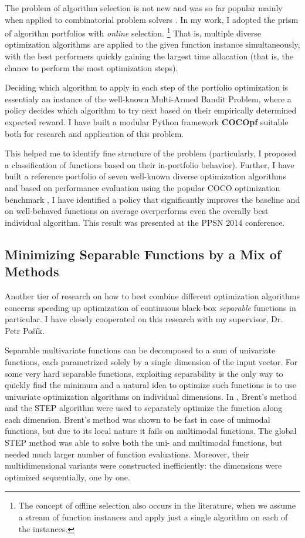 The problem of algorithm selection is not new \citep{Rice}
and was so far popular mainly when applied to
combinatorial problem solvers \citep{combpfsurvey}.
In my work, I adopted the prism of algorithm portfolios \citep{algportfolios}
with \textit{online} selection.%
\footnote{The concept of offline selection also occurs in the literature,
	when we assume a stream of function instances and apply just a single
	algorithm on each of the instances.}
That is, multiple diverse optimization algorithms are applied
to the given function instance simultaneously, with the best
performers quickly gaining the largest time allocation (that is,
the chance to perform the most optimization steps).

Deciding which algorithm to apply in each step of the portfolio
optimization is essentialy an instance of the well-known Multi-Armed
Bandit Problem, where a policy decides which algorithm to try next
based on their empirically determined expected reward.
I have built a modular Python framework \textbf{COCOpf} \citep{COCOpf}
suitable both for research and application of this problem.

This helped me to identify fine structure of the problem
(particularly, I proposed a classification of functions based on
their in-portfolio behavior).
Further, I have built a reference portfolio of seven well-known
diverse optimization algorithms and based on performance evaluation
using the popular COCO optimization benchmark \citep{COCO1}, I have
identified a policy that significantly improves the baseline and
on well-behaved functions on average overperforms even the overally
best individual algorithm. This result was presented at the
PPSN 2014 conference. \citep{optpf}

\subsection{Minimizing Separable Functions by a Mix of Methods}

Another tier of research on how to best combine different optimization
algorithms concerns speeding up optimization of continuous black-box
\textit{separable} functions in particular.  I have closely cooperated
on this research with my supervisor, Dr. Petr Pošík.

Separable multivariate functions can be decomposed to a sum of univariate
functions, each parametrized solely by a single dimension of the input
vector.
For some very hard separable functions, exploiting separability
is the only way to quickly find the minimum and a natural idea to optimize
such functions is to use univariate optimization algorithms on individual
dimensions.
In \citep{PosikGECCO2009LineSearch}, Brent's method \citep{Brent1973} and the STEP algorithm \citep{STEP} were used to separately optimize the function along each dimension.
Brent's method was shown to be fast in case of unimodal functions, but due to its local nature it fails on multimodal functions.
The global STEP method was able to solve both the uni- and multimodal functions, but needed much larger number of function evaluations.
Moreover, their multidimensional variants were constructed inefficiently: the dimensions were optimized sequentially, one by one.

